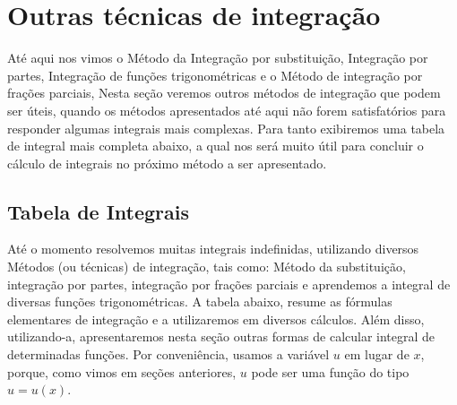 \cleardoublepage\documentclass[../main.tex]{subfiles}
\begin{document}
\section{Outras técnicas de integração}
Até aqui nos vimos o Método da Integração por substituição, Integração por partes, Integração de funções trigonométricas e o Método de integração por frações parciais, Nesta seção veremos outros métodos de integração que podem ser úteis, quando os métodos apresentados até aqui não forem satisfatórios para responder algumas integrais mais complexas. Para tanto exibiremos uma tabela de integral mais completa abaixo, a qual nos será muito útil para concluir o cálculo de integrais no próximo método a ser apresentado.
\subsection{Tabela de Integrais}
Até o momento resolvemos muitas integrais indefinidas, utilizando diversos Métodos (ou técnicas) de integração, tais como: Método da substituição, integração por partes, integração por frações parciais e aprendemos a integral de diversas funções trigonométricas. A tabela abaixo, resume as fórmulas elementares de integração e a utilizaremos em diversos cálculos. Além disso, utilizando-a, apresentaremos nesta seção outras formas de calcular integral de determinadas funções. Por conveniência, usamos a variável \(u\) em lugar de \(x\), porque, como vimos em seções anteriores, \(u\) pode ser uma função do tipo \(u=u(x)\).

\end{document}
